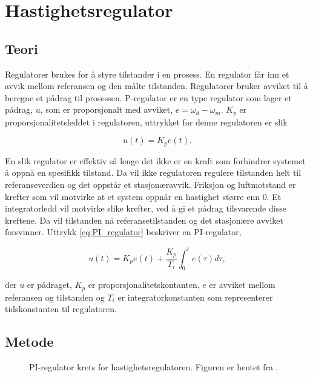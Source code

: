 \section{Hastighetsregulator}\label{sec:hastighetsreg}


\subsection{Teori}

Regulatorer brukes for å styre tilstander i en prosess. En regulator får inn et avvik mellom referansen og den målte tilstanden. Regulatorer bruker avviket til å beregne et pådrag til prosessen. P-regulator er en type regulator som lager et pådrag, $u$,  som er proporsjonalt med avviket, $e = \omega_d - \omega_m$. $K_p$ er proporsjonalitetsleddet i regulatoren, uttrykket for denne regulatoren er slik

\begin{equation}
    \label{eq:P_regulator}
    u(t) = K_p e(t).
\end{equation}

En slik regulator er effektiv så lenge det ikke er en kraft som forhindrer systemet å oppnå en spesifikk tilstand. Da vil ikke regulatoren regulere tilstanden helt til referanseverdien og det oppstår et stasjonæravvik. Friksjon og luftmotstand er krefter som vil motvirke at et system oppnår en hastighet større enn $0$. Et integratorledd vil motvirke slike krefter, ved å gi et pådrag tilsvarende disse kreftene. Da vil tilstanden nå referansetilstanden og det stasjonære avviket forsvinner. Uttrykk \eqref{eq:PI_regulator} beskriver en PI-regulator,

\begin{equation}
    \label{eq:PI_regulator}
    u(t) = K_p e(t) + \frac{K_p}{T_i} \int_{0}^{t} e(\tau) d\tau,
\end{equation}

der $u$ er pådraget, $K_p$ er proporsjonalitetskontanten, $e$ er avviket mellom referansen og tilstanden og $T_i$ er integratorkonstanten som representerer tidskonstanten til regulatoren.







\subsection{Metode}

\begin{figure}[b]
    \centering
    
    \caption{PI-regulator krets for hastighetsregulatoren. Figuren er hentet fra \cite{AnalogMotorlabbOppgaver}.}
    \label{fig:krets_hastighets_regulator}
\end{figure}

